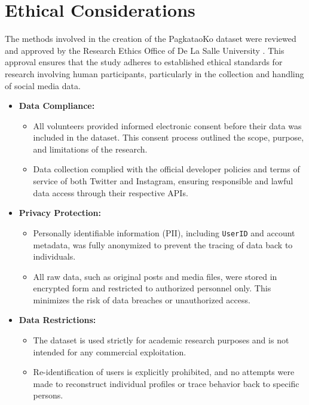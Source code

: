 %
%

\section{Ethical Considerations}
\label{sec:Ethics}

The methods involved in the creation of the PagkataoKo dataset were reviewed and approved by the Research Ethics Office of De La Salle University \citep{Tighe_Acorda_Agno_Gano_Go_Santiago_Sedillo_2022}. This approval ensures that the study adheres to established ethical standards for research involving human participants, particularly in the collection and handling of social media data.

\begin{itemize}
	\item \textbf{Data Compliance:}
	\begin{itemize}
		\item All volunteers provided informed electronic consent before their data was included in the dataset. This consent process outlined the scope, purpose, and limitations of the research.
		\item Data collection complied with the official developer policies and terms of service of both Twitter and Instagram, ensuring responsible and lawful data access through their respective APIs.
	\end{itemize}
	
	\item \textbf{Privacy Protection:}
	\begin{itemize}
		\item Personally identifiable information (PII), including \texttt{UserID} and account metadata, was fully anonymized to prevent the tracing of data back to individuals.
		\item All raw data, such as original posts and media files, were stored in encrypted form and restricted to authorized personnel only. This minimizes the risk of data breaches or unauthorized access.
	\end{itemize}
	
	\item \textbf{Data Restrictions:}
	\begin{itemize}
		\item The dataset is used strictly for academic research purposes and is not intended for any commercial exploitation.
		\item Re-identification of users is explicitly prohibited, and no attempts were made to reconstruct individual profiles or trace behavior back to specific persons.
	\end{itemize}
\end{itemize}


